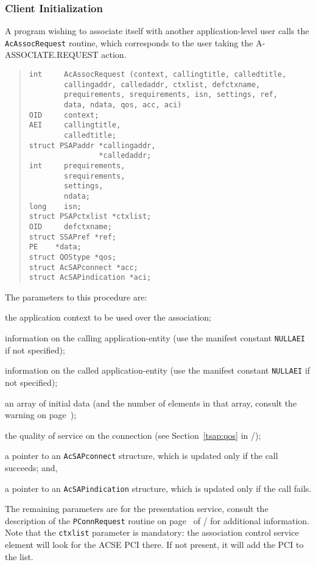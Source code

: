 \subsubsection	{Client Initialization}
A program wishing to associate itself with another application-level user 
calls the \verb"AcAssocRequest" routine,
which corresponds to the user taking the {\sf A-ASSOCIATE.REQUEST\/} action.
\begin{quote}\small\begin{verbatim}
int     AcAssocRequest (context, callingtitle, calledtitle,
        callingaddr, calledaddr, ctxlist, defctxname,
        prequirements, srequirements, isn, settings, ref,
        data, ndata, qos, acc, aci)
OID     context;
AEI     callingtitle,
        calledtitle;
struct PSAPaddr *callingaddr,
                *calledaddr;
int     prequirements,
        srequirements,
        settings,
        ndata;
long    isn;
struct PSAPctxlist *ctxlist;
OID     defctxname;
struct SSAPref *ref;
PE    *data;
struct QOStype *qos;
struct AcSAPconnect *acc;
struct AcSAPindication *aci;
\end{verbatim}\end{quote}
The parameters to this procedure are:\label{AcAssocRequest}
\begin{describe}
\item[\verb"context":] the application context to be used over the
association;

\item[\verb"callingtitle":] information on the calling application-entity
(use the manifest constant \verb"NULLAEI" if not specified);

\item[\verb"calledtitle":]  information on the called application-entity
(use the manifest constant \verb"NULLAEI" if not specified);

\item[\verb"data"/\verb"ndata":] an array of initial data
(and the number of elements in that array,
consult the warning on page~\pageref{AcSAPdata});

\item[\verb"qos":] the quality of service on the connection
(see Section~\ref{tsap:qos} in \voltwo/);

\item[\verb"acc":] a pointer to an \verb"AcSAPconnect" structure,
which is updated only if the call succeeds;
and,

\item[\verb"aci":] a pointer to an \verb"AcSAPindication" structure,
which is updated only if the call fails.
\end{describe}
The remaining parameters are for the presentation service,
consult the description of the \verb"PConnRequest" routine on
page~\pageref{PConnRequest} of \voltwo/ for additional information.
Note that the \verb"ctxlist" parameter is mandatory:
the association control service element will look for the ACSE PCI there.
If not present,
it will add the PCI to the list.

